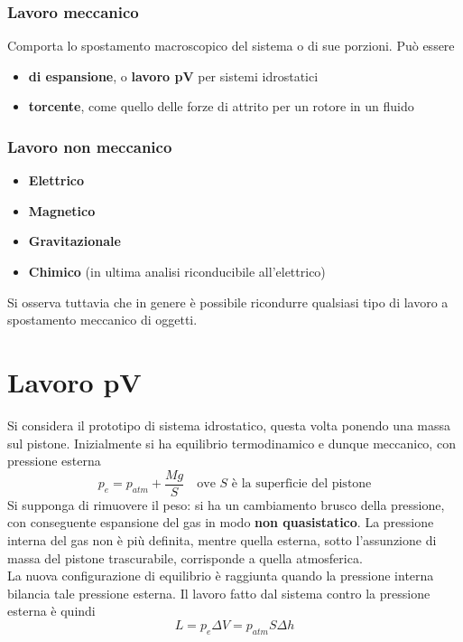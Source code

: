 \documentclass[10pt, oneside]{book}
\begin{document}
\subsubsection*{Lavoro meccanico}
Comporta lo spostamento macroscopico del sistema o di sue porzioni. Può essere
\begin{itemize}
\item \textbf{di espansione}, o \textbf{lavoro pV} per sistemi idrostatici
\item \textbf{torcente}, come quello delle forze di attrito per un rotore in un fluido
\end{itemize}
\subsubsection*{Lavoro non meccanico}
\begin{itemize}
\item \textbf{Elettrico}
\item \textbf{Magnetico}
\item \textbf{Gravitazionale}
\item \textbf{Chimico} (in ultima analisi riconducibile all'elettrico)
\end{itemize}
Si osserva tuttavia che in genere è possibile ricondurre qualsiasi tipo di lavoro a spostamento meccanico di oggetti.


\section{Lavoro pV}
Si considera il prototipo di sistema idrostatico, questa volta ponendo una massa sul pistone. Inizialmente si ha equilibrio termodinamico e dunque meccanico, con pressione esterna
\[p_e = p_{atm} + \frac{Mg}{S} \quad \textrm{ove $S$ è la superficie del pistone}\]
Si supponga di rimuovere il peso: si ha un cambiamento brusco della pressione, con conseguente espansione del gas in modo \textbf{non quasistatico}. La pressione interna del gas non è più definita, mentre quella esterna, sotto l'assunzione di massa del pistone trascurabile, corrisponde a quella atmosferica.\\
La nuova configurazione di equilibrio è raggiunta quando la pressione interna bilancia tale pressione esterna. Il lavoro fatto dal sistema contro la pressione esterna è quindi
\[L = p_e \Delta V = p_{atm} S \Delta h\]
\end{document}
